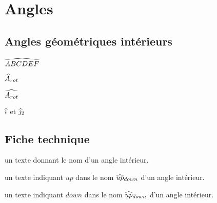 \documentclass[12pt,a4paper]{article}
\begin{document}

\section{Angles}

\subsection{Angles géométriques \og intérieurs \fg}

\newparaexample{}

\begin{latexex}
$\anglein {ABCDEF}$

$\anglein* {A}{rot}$

$\anglein {A_{rot}}$
\end{latexex}





\begin{latexex}
$\anglein{i}$ et
$\anglein*{j}{2}$
\end{latexex}




\subsection{Fiche technique}

  \hfill {}

\IDarg{} un texte donnant le nom d'un angle intérieur.


\separation



 un texte indiquant $up$ dans le nom $\anglein*{up}{down}$ d'un angle intérieur.

 un texte indiquant $down$ dans le nom $\anglein*{up}{down}$ d'un angle intérieur.
\end{document}
